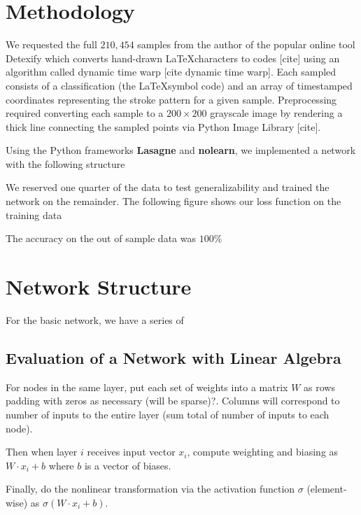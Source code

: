 \documentclass[12pt,letterpaper,boxed]{article}
\begin{document}

\section{Methodology}
		We requested the full $210,454$ samples from the author of the popular online tool Detexify which converts hand-drawn \LaTeX characters to codes [cite] using an algorithm called dynamic time warp [cite dynamic time warp]. Each sampled consists of a classification (the \LaTeX symbol code) and an array of timestamped coordinates representing the stroke pattern for a given sample. Preprocessing required converting each sample to a $200 \times 200$ grayscale image by rendering a thick line connecting the sampled points via Python Image Library [cite]. 

		Using the Python frameworks \textbf{Lasagne} and \textbf{nolearn}, we implemented a network with the following structure


		We reserved one quarter of the data to test generalizability and trained the network on the remainder. The following figure shows our loss function on the training data


		The accuracy on the out of sample data was $100\%$

	\section{Network Structure}
		For the basic network, we have a series of 

	\subsection{Evaluation of a Network with Linear Algebra}
		For nodes in the same layer, put each set of weights into a matrix $W$ as rows padding with zeros as necessary (will be sparse)?. Columns will correspond to number of inputs to the entire layer (sum total of number of inputs to each node).

		Then when layer $i$ receives input vector $x_i$, compute weighting and biasing as $W \cdot x_i + b$ where $b$ is a vector of biases.

		Finally, do the nonlinear transformation via the activation function $\sigma$ (element-wise) as $\sigma(W \cdot x_i + b)$.
\end{document}
